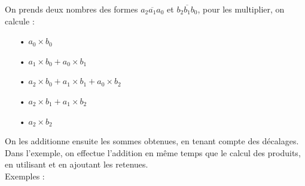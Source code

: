 \documentclass[a4paper]{article}
\begin{document}
{ \parindent=0.5cm On prends deux nombres des formes $\overline{a_2 a_1 a_0}$ et $\overline{b_2 b_1 b_0}$, pour les multiplier, on calcule :}

\begin{itemize}

	\item[•] $a_{0} \times b_{0}$
	\item[•] $a_1 \times b_{0} + a_{0} \times b_1$
	\item[•] $a_{2} \times b_{0} + a_1 \times b_1 + a_{0} \times b_{2}$
	\item[•] $a_{2} \times b_1 + a_1 \times b_{2}$
	\item[•] $a_{2} \times b_{2}$\\
	
\end{itemize}

On les additionne ensuite les sommes obtenues, en tenant compte des décalages. Dans l'exemple, on effectue l'addition en même temps que le calcul des produits, en utilisant et en ajoutant les retenues.\\


{ \parindent=0.5cm Exemples : }
\end{document}
